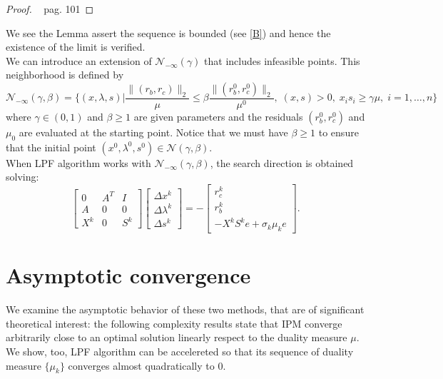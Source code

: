 \documentclass[a4paper,10 pt,titlepage,twoside]{book}
\theoremstyle{plain}
\theoremstyle{definition}
\theoremstyle{remark}
\begin{document}
\begin{proof}
	~\cite{Wright} pag. 101
\end{proof}
We see the Lemma assert the sequence is bounded (see \ref{B}) and hence the existence of the limit is verified.\\
We can introduce an extension of $\mathcal{N}_{-\infty}(\gamma)$ that includes infeasible points. This neighborhood is defined by
\begin{equation}\label{neigh3}
\mathcal{N}_{-\infty}(\gamma,\beta) =\Bigg\{(x, \lambda, s) | \frac{\lVert(r_{b}, r_{c})\rVert_{2}}{\mu} \leq \beta\frac{\lVert(r_{b}^{0}, r_{c}^{0})\rVert_{2}}{\mu^{0}},\; (x, s)>0,\; x_{i}s_{i} \geq \gamma\mu,\;i = 1,\dots, n \Bigg\}
\end{equation}
where $\gamma\in(0,1)$ and $\beta \geq 1$ are given parameters and the residuals $(r_{b}^{0}, r_{c}^{0})$ and $\mu_{0}$ are evaluated at the starting point. Notice that we must have $\beta \geq 1$ to ensure that the initial point $(x^{0}, \lambda^{0}, s^{0})\in\mathcal{N}(\gamma,\beta)$.\\
When LPF algorithm works with $\mathcal{N}_{-\infty}(\gamma,\beta)$, the search direction is obtained solving:
	\begin{equation*}
\begin{bmatrix}
0&A^{T}&I \\A&0&0\\X^{k}&0&S^{k}
\end{bmatrix}\begin{bmatrix}
\Delta x^{k}\\\Delta\lambda^{k} \\\Delta s^{k}
\end{bmatrix}=-\begin{bmatrix}
r_{c}^{k}\\r_{b}^{k}\\-X^{k}S^{k}e + \sigma_{k}\mu_{k}e
\end{bmatrix}.
\end{equation*}
\section{Asymptotic convergence}
We examine the asymptotic behavior of these two methods, that are of significant theoretical interest: the following complexity results state that IPM converge arbitrarily close to an optimal solution linearly respect to the duality measure $\mu$. We show, too, LPF algorithm can be accelereted so that its sequence of duality measure $\{\mu_{k}\}$ converges almost quadratically to 0.\\
\end{document}
